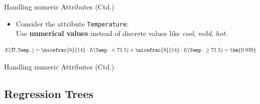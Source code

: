 \begin{frame}{Handling numeric Attributes (Ctd.)}{}\important
	\begin{itemize}
		\item Consider the attribute \texttt{Temperature}: \\
			Use \textbf{numerical values} instead of discrete values like \textit{cool}, \textit{mild}, \textit{hot}:
	\end{itemize}
	\vspace*{-3mm}
	
	\vspace*{2mm}
	\begin{equation*}
			E(\mathcal{D}, \texttt{Temp.})
				= \nicefrac{6}{14} \cdot E(\texttt{Temp.} < 71.5) + \nicefrac{8}{14} \cdot E(\texttt{Temp.} \ge 71.5)
				= \bm{0.939}
		\end{equation*}
\end{frame}


\begin{frame}{Handling numeric Attributes (Ctd.)}{}
	
\end{frame}


\subsection{Regression Trees}

